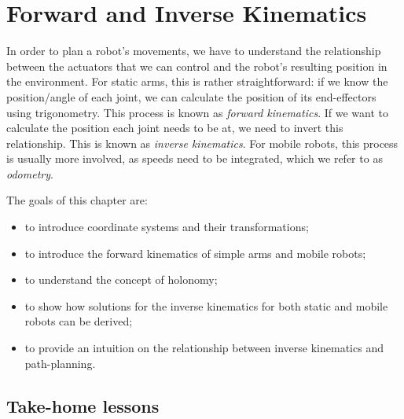 \chapter{Forward and Inverse Kinematics}\label{chap:kinematics}

In order to plan a robot's movements, we have to understand the relationship between the actuators that we can control and the robot's resulting position in the environment. For static arms, this is rather straightforward: if we know the position/angle of each joint, we can calculate the position of its end-effectors using trigonometry. This process is known as \emph{forward kinematics}.  If we want to calculate the position each joint needs to be at, we need to invert this relationship. This is known as \emph{inverse kinematics}.  For mobile robots, this process is usually more involved, as speeds need to be integrated, which we refer to as \emph{odometry}.

The goals of this chapter are:

\begin{itemize}
\item to introduce coordinate systems and their transformations;
\item to introduce the forward kinematics of simple arms and mobile robots;
\item to understand the concept of holonomy;
\item to show how solutions for the inverse kinematics for both static and mobile robots can be derived;
\item to provide an intuition on the relationship between inverse kinematics and path-planning.
\end{itemize}







\section*{Take-home lessons}

